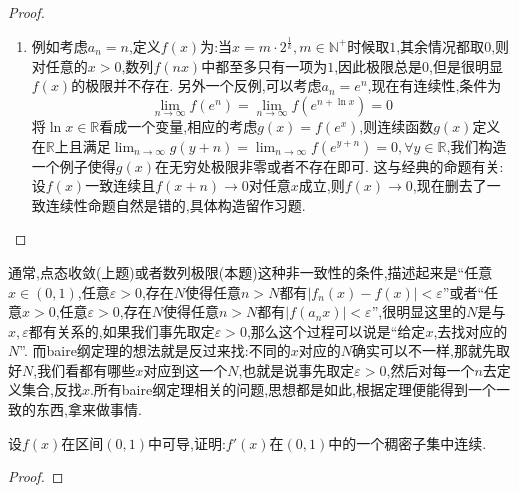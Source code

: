 \documentclass[../../main.tex]{subfiles}%
\begin{document}
\begin{proof}
\begin{enumerate}
\item 例如考虑\(a_n = n\),定义\(f(x)\)为:当\(x = m\cdot2^{\frac{1}{k}},m\in\mathbb{N}^+\)时候取\(1\),其余情况都取\(0\),则对任意的\(x > 0\),数列\(f(nx)\)中都至多只有一项为\(1\),因此极限总是\(0\),但是很明显\(f(x)\)的极限并不存在.
另外一个反例,可以考虑\(a_n = e^n\),现在有连续性,条件为
\[
\lim_{n\to\infty}f(e^n)=\lim_{n\to\infty}f(e^{n+\ln x}) = 0
\]
将\(\ln x\in\mathbb{R}\)看成一个变量,相应的考虑\(g(x)=f(e^x)\),则连续函数\(g(x)\)定义在\(\mathbb{R}\)上且满足\(\lim_{n\to\infty}g(y + n)=\lim_{n\to\infty}f(e^{y + n}) = 0,\forall y\in\mathbb{R}\),我们构造一个例子使得\(g(x)\)在无穷处极限非零或者不存在即可.
这与经典的命题有关:设\(f(x)\)一致连续且\(f(x + n)\to0\)对任意\(x\)成立,则\(f(x)\to0\),现在删去了一致连续性命题自然是错的,具体构造留作习题.
\end{enumerate}

\end{proof}
\begin{remark}
通常,点态收敛(上题)或者数列极限(本题)这种非一致性的条件,描述起来是“任意\(x\in(0,1)\),任意\(\varepsilon > 0\),存在\(N\)使得任意\(n > N\)都有\(|f_n(x)-f(x)|<\varepsilon\)”或者“任意\(x > 0\),任意\(\varepsilon > 0\),存在\(N\)使得任意\(n > N\)都有\(|f(a_nx)|<\varepsilon\)”,很明显这里的\(N\)是与\(x,\varepsilon\)都有关系的,如果我们事先取定\(\varepsilon > 0\),那么这个过程可以说是“给定\(x\),去找对应的\(N\)”.
而baire纲定理的想法就是反过来找:不同的\(x\)对应的\(N\)确实可以不一样,那就先取好\(N\),我们看都有哪些\(x\)对应到这一个\(N\),也就是说事先取定\(\varepsilon > 0\),然后对每一个\(n\)去定义集合,反找\(x\).所有baire纲定理相关的问题,思想都是如此,根据定理便能得到一个一致的东西,拿来做事情.
\end{remark}

\begin{example}
设\(f(x)\)在区间\((0,1)\)中可导,证明:\(f'(x)\)在\((0,1)\)中的一个稠密子集中连续.
\end{example}
\begin{proof}



\end{proof}
\end{document}
